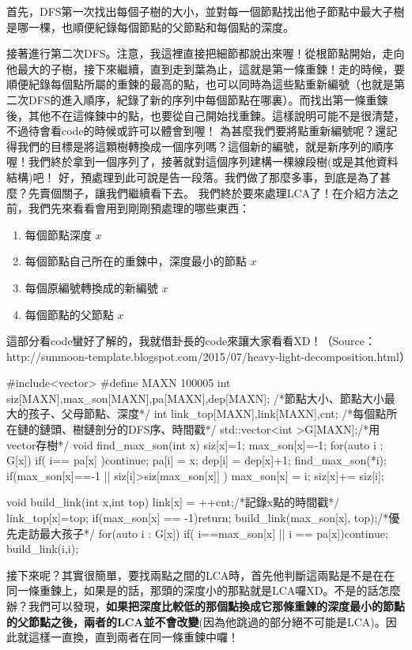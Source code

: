 \documentclass[main.tex]{subfiles}
\begin{document}
	首先，DFS第一次找出每個子樹的大小，並對每一個節點找出他子節點中最大子樹是哪一棵，也順便紀錄每個節點的父節點和每個點的深度。
	
	接著進行第二次DFS。注意，我這裡直接把細節都說出來喔！從根節點開始，走向他最大的子樹，接下來繼續，直到走到葉為止，這就是第一條重鍊！走的時候，要順便紀錄每個點所屬的重鍊的最高的點，也可以同時為這些點重新編號（也就是第二次DFS的進入順序，紀錄了新的序列中每個節點在哪裏）。而找出第一條重鍊後，其他不在這條鍊中的點，也要從自己開始找重鍊。這樣說明可能不是很清楚，不過待會看code的時候或許可以體會到喔！
	為甚麼我們要將點重新編號呢？還記得我們的目標是將這顆樹轉換成一個序列嗎？這個新的編號，就是新序列的順序喔！我們終於拿到一個序列了，接著就對這個序列建構一棵線段樹(或是其他資料結構)吧！
	好，預處理到此可說是告一段落。我們做了那麼多事，到底是為了甚麼？先賣個關子，讓我們繼續看下去。
	我們終於要來處理LCA了！在介紹方法之前，我們先來看看會用到剛剛預處理的哪些東西：
	\begin{enumerate}
		\item 每個節點深度 \inline{dep[}$x$\inline{]}
		\item 每個節點自己所在的重鍊中，深度最小的節點 \inline{link\_top[}$x$\inline{]}
		\item 每個原編號轉換成的新編號 \inline{link[}$x$\inline{]}
		\item 每個節點的父節點 \inline{pa[}$x$\inline{]}
	\end{enumerate}
這部分看code蠻好了解的，我就借卦長的code來讓大家看看XD！（Source： http://sunmoon-template.blogspot.com/2015/07/heavy-light-decomposition.html）
	\begin{C++}
#include<vector>
#define MAXN 100005
int siz[MAXN],max_son[MAXN],pa[MAXN],dep[MAXN];
/*節點大小、節點大小最大的孩子、父母節點、深度*/
int link_top[MAXN],link[MAXN],cnt;
/*每個點所在鏈的鏈頭、樹鏈剖分的DFS序、時間戳*/
std::vector<int >G[MAXN];/*用vector存樹*/
void find_max_son(int x){
	siz[x]=1;
	max_son[x]=-1;
	for(auto i : G[x]){
		if( i== pa[x] )continue;
		pa[i] = x;
		dep[i] = dep[x]+1;
		find_max_son(*i);
		if(max_son[x]==-1 || siz[i]>siz[max_son[x]] ) max_son[x] = i;
		siz[x]+= siz[i];
	}
}

void build_link(int x,int top){
	link[x] = ++cnt;/*記錄x點的時間戳*/
	link_top[x]=top;
	if(max_son[x] == -1)return;
	build_link(max_son[x], top);/*優先走訪最大孩子*/
	for(auto i : G[x]){
		if( i==max_son[x] || i == pa[x])continue;
		build_link(i,i);
	}
}
	\end{C++}
	接下來呢？其實很簡單，要找兩點之間的LCA時，首先他判斷這兩點是不是在在同一條重鍊上，如果是的話，那頭的深度小的那點就是LCA囉XD。不是的話怎麼辦？我們可以發現，\textbf{如果把深度比較低的那個點換成它那條重鍊的深度最小的節點的父節點之後，兩者的LCA並不會改變}(因為他跳過的部分絕不可能是LCA)。因此就這樣一直換，直到兩者在同一條重鍊中囉！
\end{document}
